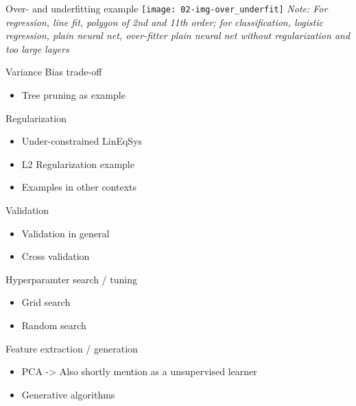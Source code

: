    \begin{frame}{Over- and underfitting example}
      \texttt{[image: 02-img-over\_underfit]}
      \enlargethispage{3em}
      \emph{\footnotesize Note: For regression, line fit, polygon of 2nd and 11th order; for classification, logistic regression, plain neural net, over-fitter plain neural net without regularization and too large layers}
    \end{frame}

    \begin{frame}{Variance Bias trade-off}
      \begin{itemize}
        \item Tree pruning as example
      \end{itemize}
    \end{frame}

    \begin{frame}{Regularization}
      \begin{itemize}
        \item Under-constrained LinEqSys
        \item L2 Regularization example
        \item Examples in other contexts
      \end{itemize}
    \end{frame}

    \begin{frame}{Validation}
      \begin{itemize}
        \item Validation in general
        \item Cross validation
      \end{itemize}
    \end{frame}

    \begin{frame}{Hyperparamter search / tuning}
      \begin{itemize}
        \item Grid search
        \item Random search
      \end{itemize}
    \end{frame}

    \begin{frame}{Feature extraction / generation}
      \begin{itemize}
        \item PCA -> Also shortly mention as a unsupervised learner
        \item Generative algorithms
      \end{itemize}
    \end{frame}

